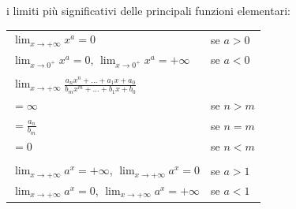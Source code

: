 \documentclass{book}
\begin{document}
\noindent\begin{minipage}{\textwidth}
    \begin{proposition}
        i limiti più significativi delle principali funzioni elementari:
        \begin{center}
            \renewcommand{\arraystretch}{1.5} %
            \begin{tabular}{l l}
                $\displaystyle \lim_{x \to +\infty} x^a = 0$                                                                                                & se $a > 0$                                                                    \\
                $\displaystyle \lim_{x \to 0^+} x^a = 0$, $\displaystyle \lim_{x \to 0^+} x^a = +\infty$                                                    & se $a < 0$                                                                    \\
                \\
                $\displaystyle \lim_{x \to +\infty} \frac{a_n x^n + \ldots + a_1 x + a_0}{b_m x^m + \ldots + b_1 x + b_0}$                                  &                                                                               \\
                $= \infty$                                                                                                                                  & se $n > m$                                                                    \\
                $= \frac{a_n}{b_m}$                                                                                                                         & se $n = m$                                                                    \\
                $= 0$                                                                                                                                       & se $n < m$                                                                    \\
                \\
                $\displaystyle \lim_{x \to +\infty} a^x = +\infty$, $\displaystyle \lim_{x \to +\infty} a^x = 0$                                            & se $a > 1$                                                                    \\
                $\displaystyle \lim_{x \to +\infty} a^x = 0$, $\displaystyle \lim_{x \to +\infty} a^x = +\infty$                                            & se $a < 1$                                                                    \\

\end{tabular}
\end{center}
\end{proposition}
\end{minipage}
\end{document}
